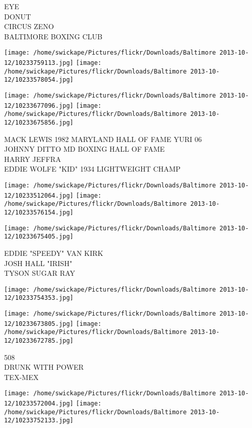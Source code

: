 \documentclass[10pt,letterpaper]{article}
\begin{document}
EYE\\
DONUT\\
CIRCUS ZENO\\
BALTIMORE BOXING CLUB
\pagebreak

\texttt{[image: /home/swickape/Pictures/flickr/Downloads/Baltimore 2013-10-12/10233759113.jpg]}
\texttt{[image: /home/swickape/Pictures/flickr/Downloads/Baltimore 2013-10-12/10233578054.jpg]}

\texttt{[image: /home/swickape/Pictures/flickr/Downloads/Baltimore 2013-10-12/10233677096.jpg]}
\texttt{[image: /home/swickape/Pictures/flickr/Downloads/Baltimore 2013-10-12/10233675856.jpg]}

MACK LEWIS 1982 MARYLAND HALL OF FAME YURI 06\\
JOHNNY DITTO MD BOXING HALL OF FAME\\
HARRY JEFFRA\\
EDDIE WOLFE "KID" 1934 LIGHTWEIGHT CHAMP
\pagebreak

\texttt{[image: /home/swickape/Pictures/flickr/Downloads/Baltimore 2013-10-12/10233512064.jpg]}
\texttt{[image: /home/swickape/Pictures/flickr/Downloads/Baltimore 2013-10-12/10233576154.jpg]}

\vspace{0.25in}
\texttt{[image: /home/swickape/Pictures/flickr/Downloads/Baltimore 2013-10-12/10233675405.jpg]}

EDDIE "SPEEDY" VAN KIRK\\
JOSH HALL "IRISH"\\
TYSON SUGAR RAY
\pagebreak

\texttt{[image: /home/swickape/Pictures/flickr/Downloads/Baltimore 2013-10-12/10233754353.jpg]}

\vspace{0.25in}
\texttt{[image: /home/swickape/Pictures/flickr/Downloads/Baltimore 2013-10-12/10233673805.jpg]}
\texttt{[image: /home/swickape/Pictures/flickr/Downloads/Baltimore 2013-10-12/10233672785.jpg]}

508\\
DRUNK WITH POWER\\
TEX{-}MEX
\pagebreak

\texttt{[image: /home/swickape/Pictures/flickr/Downloads/Baltimore 2013-10-12/10233572004.jpg]}
\texttt{[image: /home/swickape/Pictures/flickr/Downloads/Baltimore 2013-10-12/10233752133.jpg]}
\end{document}
